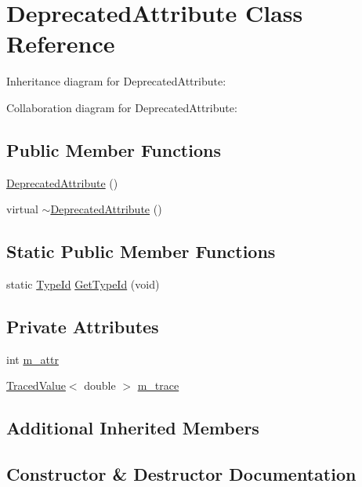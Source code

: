 \hypertarget{classDeprecatedAttribute}{}\section{Deprecated\+Attribute Class Reference}
\label{classDeprecatedAttribute}


Inheritance diagram for Deprecated\+Attribute\+:


Collaboration diagram for Deprecated\+Attribute\+:
\subsection*{Public Member Functions}
\begin{DoxyCompactItemize}
\item 
\hyperlink{classDeprecatedAttribute_ac32dfd1a66706bb2b94a0ac29a54c93e}{Deprecated\+Attribute} ()
\item 
virtual \hyperlink{classDeprecatedAttribute_a48d2b08786074601e8a7f1a4c8c80ba4}{$\sim$\+Deprecated\+Attribute} ()
\end{DoxyCompactItemize}
\subsection*{Static Public Member Functions}
\begin{DoxyCompactItemize}
\item 
static \hyperlink{classns3_1_1TypeId}{Type\+Id} \hyperlink{classDeprecatedAttribute_a6288a8b7cf3b4b8ccc271c72d3241c9c}{Get\+Type\+Id} (void)
\end{DoxyCompactItemize}
\subsection*{Private Attributes}
\begin{DoxyCompactItemize}
\item 
int \hyperlink{classDeprecatedAttribute_a7037b9439000c89a1447139730ac6aa9}{m\+\_\+attr}
\item 
\hyperlink{classns3_1_1TracedValue}{Traced\+Value}$<$ double $>$ \hyperlink{classDeprecatedAttribute_ac6092d8f46c3ca12f4a535c850a6ef55}{m\+\_\+trace}
\end{DoxyCompactItemize}
\subsection*{Additional Inherited Members}


\subsection{Constructor \& Destructor Documentation}
